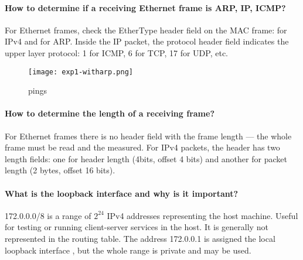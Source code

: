 \documentclass[compilation.tex]{subfiles}
\begin{document}
\paragraph{How to determine if a receiving Ethernet frame is ARP, IP, ICMP?} 
For Ethernet frames, check the EtherType header field on the MAC frame:  for IPv4 and  for ARP. Inside the IP packet, the protocol header field indicates the upper layer protocol: 1 for ICMP, 6 for TCP, 17 for UDP, etc.

\begin{figure}[htb]
\centering
\texttt{[image: exp1-witharp.png]}
\caption{ pings }
\label{fig:exp1-witharp}
\end{figure}

\paragraph{How to determine the length of a receiving frame?}
For Ethernet frames there is no header field with the frame length --- the whole frame must be read and the measured.
For IPv4 packets, the header has two length fields: one for header length (4bits, offset 4 bits) and another for packet length (2 bytes, offset 16 bits).

\paragraph{What is the loopback interface and why is it important?}
172.0.0.0/8 is a range of $2^{24}$ IPv4 addresses representing the host machine.
Useful for testing or running client-server services in the host. It is generally not represented in the routing table. The address 172.0.0.1 is assigned the local loopback interface , but the whole range is private and may be used.
\end{document}
